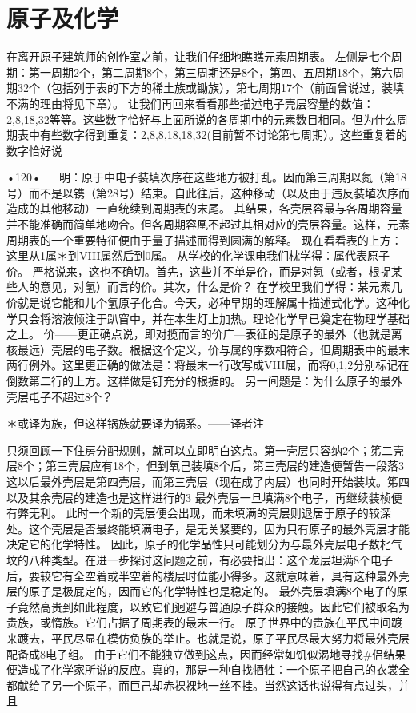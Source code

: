 \section{原子及化学}

在离开原子建筑师的创作室之前，让我们仔细地瞧瞧元素周期表。
左侧是七个周期：第一周期2个，第二周期8个，第三周期还是8个，第四、五周期18个，第六周期32个（包括列于表的下方的稀土族或锄族），第七周期17个（前面曾说过，装填不满的理由将见下章）。
让我们再回来看看那些描述电子壳层容量的数值：2,8,18,32等等。这些数字恰好与上面所说的各周期中的元素数目相同。但为什么周期表中有些数字得到重复：2,8,8,18,18,32(目前暂不讨论第七周期）。这些重复着的数字恰好说

•120•
  
明：原于中电子装填次序在这些地方被打乱。因而第三周期以氮（第18号）而不是以镌（第28号）结束。自此往后，这种移动（以及由于违反装埴次序而造成的其他移动）一直统续到周期表的末尾。
其结果，各壳层容最与各周期容量并不能准确而简单地吻合。但各周期容凰不超过其相对应的壳层容量。这样，元素周期表的一个重要特征便由于量子描述而得到圆满的解释。
现在看看表的上方：这里从1属＊到VIII属然后到0属。
从学校的化学课电我们枕学得：属代表原子价。
严格说来，这也不确切。首先，这些并不单是价，而是对氪（或者，根捉某些人的意见，对氢）而言的价。其次，什么是价？
在学校里我们学得：某元素几价就是说它能和儿个氢原子化合。今天，必种早期的理解属十描述式化学。这种化学只会将溶液倾注于趴窅中，并在本生灯上加热。理论化学早已奠定在物理学基础之上。
价——更正确点说，即对揽而言的价广—表征的是原子的最外（也就是离核最远）壳层的电子数。根据这个定义，价与属的序数相符合，但周期表中的最末两行例外。这里更正确的做法是：将最末一行改写成VIII屈，而将0,1,2分别标记在倒数第二行的上方。这样做是钉充分的根据的。
另一间题是：为什么原子的最外壳层屯子不超过8个？

＊或译为族，但这样锅族就要译为锅系。—---译者注

只须回顾一下住房分配规则，就可以立即明白这点。第一壳层只容纳2个；笫二壳层8个；第三壳层应有18个，但到氧己装填8个后，第三壳层的建造便暂告一段落3这以后最外壳层是第四壳层，而第三壳层（现在成了内层）也同时开始装坟。笫四以及其余壳层的建造也是这样进行的3
最外壳层一旦填满8个电子，再继续装桢便有弊无利。
此时一个新的壳层便会出现，而未填满的壳层则退居于原子的较深处。这个壳层是否最终能填满电子，是无关紧要的，因为只有原子的最外壳层才能决定它的化学特性。
因此，原子的化学品性只可能划分为与最外壳层电子数朼气坟的八种类型。在进一步探讨这问题之前，有必要指出：这个龙层坦满8个电子后，要较它有全空着或半空着的楼层时位能小得多。这就意味着，具有这种最外壳层的原子是极屁定的，因而它的化学特性也是稳定的。
最外壳层填满8个电子的原子竟然高贵到如此程度，以致它们迥避与普通原子群众的接触。因此它们被取名为贵族，或惰族。它们占据了周期表的最末一行。
原子世界中的贵族在平民中间踱来踱去，平民尽显在模仿负族的举止。也就是说，原子平民尽最大努力将最外壳层配备成8电子组。
由于它们不能独立做到这点，因而经常如饥似渴地寻找#侣结果便造成了化学家所说的反应。真的，那是一种自找牺牲：一个原子把自己的衣裳全都献给了另一个原子，而巨己却赤裸裸地一丝不挂。当然这话也说得有点过头，并且

